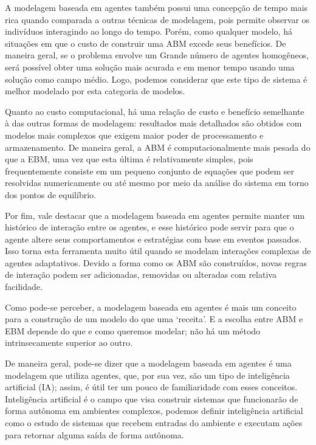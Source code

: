 A modelagem baseada em agentes também possui uma concepção de tempo mais rica quando comparada a outras técnicas de modelagem, pois permite observar os indivíduos interagindo ao longo do tempo. Porém, como qualquer modelo, há situações em que o custo de construir uma ABM excede seus benefícios. De maneira geral, se o problema envolve um Grande número de agentes homogêneos, será possível obter uma solução mais acurada e em menor tempo usando uma solução como campo médio. Logo, podemos considerar que este tipo de sistema é melhor modelado por esta categoria de modelos. 

Quanto ao custo computacional, há uma relação de custo e benefício semelhante à das outras formas de modelagem: resultados mais detalhados são obtidos com modelos mais complexos que exigem maior poder de processamento e armazenamento. De maneira geral, a ABM é computacionalmente mais pesada do que a EBM, uma vez que esta última é relativamente simples, pois frequentemente consiste em um pequeno conjunto de equações que podem ser resolvidas numericamente ou até mesmo por meio da análise do sistema em torno dos pontos de equilíbrio.

Por fim, vale destacar que a modelagem baseada em agentes permite manter um histórico de interação entre os agentes, e esse histórico pode servir para que o agente altere seus comportamentos e estratégias com base em eventos passados. Isso torna esta ferramenta muito útil quando se modelam interações complexas de agentes adaptativos. Devido a forma como os ABM são construídos, novas regras de interação podem ser adicionadas, removidas ou alteradas com relativa facilidade.

Como pode-se perceber, a modelagem baseada em agentes é mais um conceito para a construção de um modelo do que uma `receita'. E a escolha entre ABM e EBM depende do que e como queremos modelar; não há um método intrinsecamente superior ao outro. %

De maneira geral, pode-se dizer que a modelagem baseada em agentes é uma modelagem que utiliza agentes, que, por sua vez, são um tipo de inteligência artificial (IA); assim, é útil ter um pouco de familiaridade com esses conceitos. Inteligência artificial é o campo que visa construir sistemas que funcionarão de forma autônoma em ambientes complexos, podemos definir inteligência artificial como o estudo de sistemas que recebem entradas do ambiente e executam ações para retornar alguma saída de forma autônoma\cite{phdthesis}. %

